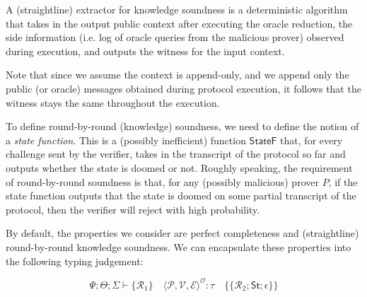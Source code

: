 A (straightline) extractor for knowledge soundness is a deterministic algorithm that takes in the output public context after executing the oracle reduction, the side information (i.e. log of oracle queries from the malicious prover) observed during execution, and outputs the witness for the input context.

Note that since we assume the context is append-only, and we append only the public (or oracle)
messages obtained during protocol execution, it follows that the witness stays the same throughout
the execution.

\begin{definition}
    \label{def:knowledge_soundness}
\end{definition}

To define round-by-round (knowledge) soundness, we need to define the notion of a \emph{state function}. This is a (possibly inefficient) function $\mathsf{StateF}$ that, for every challenge sent by the verifier, takes in the transcript of the protocol so far and outputs whether the state is doomed or not. Roughly speaking, the requirement of round-by-round soundness is that, for any (possibly malicious) prover $P$, if the state function outputs that the state is doomed on some partial transcript of the protocol, then the verifier will reject with high probability.

\begin{definition}
    \label{def:state_function}
\end{definition}

\begin{definition}
    \label{def:round_by_round_soundness}
\end{definition}

\begin{definition}
    \label{def:round_by_round_knowledge_soundness}
\end{definition}

By default, the properties we consider are perfect completeness and (straightline) round-by-round knowledge soundness. We can encapsulate these properties into the following typing judgement:

\[
    \Psi; \Theta; \varSigma \vdash \{\mathcal{R}_1\} \quad \langle\mathcal{P}, \mathcal{V}, \mathcal{E}\rangle^{\mathcal{O}} : \tau \quad \{\!\{\mathcal{R}_2; \mathsf{St}; \epsilon\}\!\}
\]

